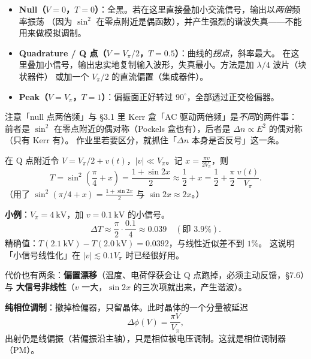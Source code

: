 \documentclass[11pt]{ctexart}
\let\subhdrtheme\subhdr
\renewcommand{\subhdr}[1]{\needspace{3\baselineskip}\subhdrtheme{#1}}
\begin{document}
\begin{itemize}
\item \textbf{Null（$V=0$，$T=0$）}：全黑。若在这里直接叠加小交流信号，输出以\emph{两倍}频率振荡
      （因为 $\sin^2$ 在零点附近是偶函数），并产生强烈的谐波失真——不能用来做模拟调制。
\item \textbf{Quadrature / Q 点（$V=V_\pi/2$，$T=0.5$）}：曲线的\emph{拐点}，斜率最大。
      在这里叠加小信号，输出忠实地复制输入波形，失真最小。方法是加 $\lambda/4$ 波片（块状器件）
      或加一个 $V_\pi/2$ 的直流偏置（集成器件）。
\item \textbf{Peak（$V=V_\pi$，$T=1$）}：偏振面正好转过 $90^\circ$，全部透过正交检偏器。
\end{itemize}

注意「null 点两倍频」与 §3.1 里 Kerr 盒「AC 驱动两倍频」是\emph{不同}的两件事：
前者是 $\sin^2$ 在零点附近的偶对称（Pockels 盒也有），后者是 $\Delta n\propto E^2$ 的偶对称（只有 Kerr 有）。
作业里若要区分，就抓住「$\Delta n$ 本身是否反号」这一条。


在 Q 点附近令 $V=V_\pi/2+v(t)$，$|v|\ll V_\pi$。记 $x=\frac{\pi v}{2V_\pi}$，则
\begin{equation}
T=\sin^{2}\!\left(\frac{\pi}{4}+x\right)=\frac{1+\sin 2x}{2}
\approx\frac{1}{2}+x
=\frac{1}{2}+\frac{\pi}{2}\,\frac{v(t)}{V_\pi}.
\end{equation}
（用了 $\sin^{2}(\pi/4+x)=\frac{1+\sin2x}{2}$ 与 $\sin2x\approx2x$。）

\textbf{小例}：$V_\pi=4\ \mathrm{kV}$，加 $v=0.1\ \mathrm{kV}$ 的小信号。
\begin{equation}
\Delta T\approx\frac{\pi}{2}\cdot\frac{0.1}{4}\approx0.039\quad(\text{即 }3.9\%).
\end{equation}
精确值：$T(2.1\ \mathrm{kV})-T(2.0\ \mathrm{kV})=0.0392$，与线性近似差不到 $1\%$。
这说明「小信号线性化」在 $|v|\lesssim0.1V_\pi$ 时已经很好用。

代价也有两条：\textbf{偏置漂移}（温度、电荷俘获会让 Q 点跑掉，必须主动反馈，§7.6）与
\textbf{大信号非线性}（$v$ 一大，$\sin2x$ 的三次项就出来，产生谐波）。


\textbf{纯相位调制}：撤掉检偏器，只留晶体。此时晶体的一个分量被延迟
\begin{equation}
\Delta\phi(V)=\frac{\pi V}{V_\pi},
\end{equation}
出射仍是线偏振（若偏振沿主轴），只是相位被电压调制。这就是相位调制器（PM）。
\end{document}
